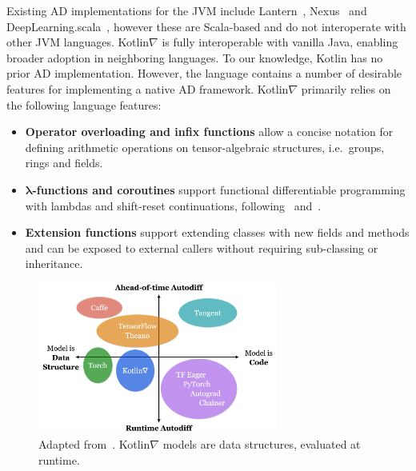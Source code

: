\documentclass[12pt,initial,twoside,maitrise]{dms}
\numberwithin{equation}{section}
\numberwithin{table}{chapter}
\numberwithin{figure}{chapter}
\begin{document}
Existing AD implementations for the JVM include Lantern~\cite{DBLP:journals-corr-abs-1803-10228}, Nexus~\cite{chen2017typesafe} and DeepLearning.scala~\cite{dl4s}, however these are Scala-based and do not interoperate with other JVM languages. Kotlin$\nabla$ is fully interoperable with vanilla Java, enabling broader adoption in neighboring languages. To our knowledge, Kotlin has no prior AD implementation. However, the language contains a number of desirable features for implementing a native AD framework. Kotlin$\nabla$ primarily relies on the following language features:

\begin{itemize}
\item \textbf{Operator overloading and infix functions} allow a concise notation for defining arithmetic operations on tensor-algebraic structures, i.e.\ groups, rings and fields.
\item \textbf{$\mathbf{\lambda}$-functions and coroutines} support functional differentiable programming with lambdas and shift-reset continuations, following~\cite{pearlmutter2008reverse} and~\cite{DBLP:journals-corr-abs-1803-10228}.
\item \textbf{Extension functions} support extending classes with new fields and methods and can be exposed to external callers without requiring sub-classing or inheritance.
\end{itemize}

\begin{figure}
    \centering
    \includegraphics[width=0.70\textwidth]{kotlingrad_diagram.png}
    \caption{Adapted from~\cite{van2018tangent}. Kotlin$\nabla$ models are data structures, evaluated at runtime.}
    \label{fig:kotlingrad_digram}
\end{figure}
\end{document}
